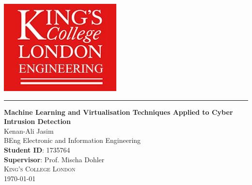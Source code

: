 \begin{titlepage}
	\begin{center}
	\includegraphics[scale = 0.5]{Images/kings.jpg}\\
	[1cm]
	\hrule 
	\vspace{0.5cm}
	\huge{\bfseries Machine Learning and Virtualisation Techniques Applied to Cyber Intrusion Detection}\\
	\vspace*{\fill}
	\large{Kenan-Ali Jasim}\\
	\large{BEng Electronic and Information Engineering }\\
    \vspace*{\fill}
	\large{\textbf{Student ID}: 1735764}\\
	\large{\textbf{Supervisor}: Prof. Mischa Dohler}\\
	\textsc{\large 	King's College London \\ \today\\}
	\end{center}
\end{titlepage}
